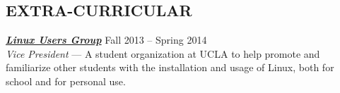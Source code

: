 \documentclass[line,letterpaper]{resume}
\begin{document}
\begin{resume}
    
    \section{\uppercase{Extra-Curricular}}
    {\sl\textbf{\href{linux.ucla.edu}{Linux Users Group}}} \hfill Fall 2013 -- Spring 2014\\
    \emph{Vice President} --- A student organization at UCLA to help promote
	and familiarize other students with the installation and usage of Linux,
	both for school and for personal use.

\end{resume}
\end{document}
